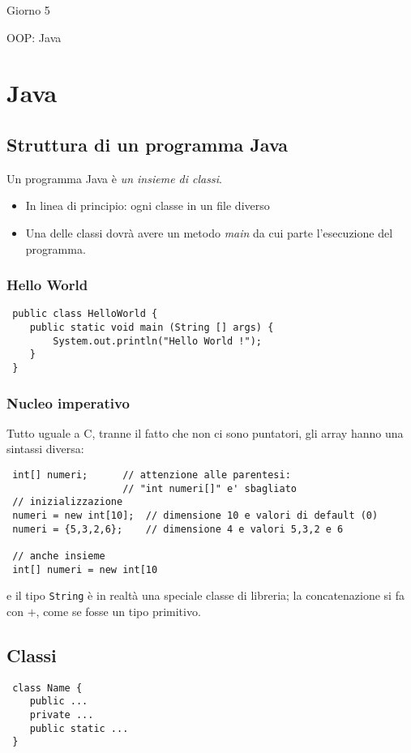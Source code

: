 \documentclass[a4paper,10pt]{article}
\begin{document}
\begin{center}
    \LARGE Giorno 5\smallskip

    \Large OOP: Java
\end{center}\smallskip

\section{Java}
\subsection{Struttura di un programma Java}
Un programma Java è \emph{un insieme di classi}. 
\begin{itemize}
 \item In linea di principio: ogni classe in un file diverso
 \item Una delle classi dovrà avere un metodo \emph{main} da cui parte l'esecuzione del programma.
\end{itemize}
\subsubsection{Hello World}
\begin{lstlisting}
 public class HelloWorld {
    public static void main (String [] args) {
        System.out.println("Hello World !");
    }
 }
\end{lstlisting}
\subsubsection{Nucleo imperativo}
Tutto uguale a C, tranne il fatto che non ci sono puntatori, gli array hanno una sintassi diversa:
\begin{lstlisting}
 int[] numeri;      // attenzione alle parentesi:
                    // "int numeri[]" e' sbagliato
 // inizializzazione
 numeri = new int[10];  // dimensione 10 e valori di default (0)
 numeri = {5,3,2,6};    // dimensione 4 e valori 5,3,2 e 6
 
 // anche insieme
 int[] numeri = new int[10
\end{lstlisting}

e il tipo \texttt{String} è in realtà una speciale classe di libreria; la concatenazione si fa con $+$, come se fosse un tipo primitivo.

\subsection{Classi}
\begin{lstlisting}
 class Name {
    public ...
    private ...
    public static ...
 }
\end{lstlisting}
\end{document}
